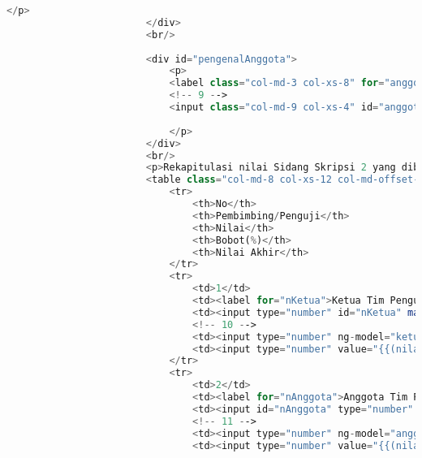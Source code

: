 \begin{lstlisting}[language=PHP,basicstyle=\tiny,caption=skripsi.php]
							</p>
						</div>
						<br/>
					
						<div id="pengenalAnggota">
							<p>
							<label class="col-md-3 col-xs-8" for="anggota">Anggota Tim Penguji:</label>
							<!-- 9 -->
							<input class="col-md-9 col-xs-4" id="anggota" name="namaAnggotaTimPenguji" />
							
							</p>
						</div>
						<br/>
						<p>Rekapitulasi nilai Sidang Skripsi 2 yang diberikan oleh pembimbing, penguji & koordinator skripsi:</p>
						<table class="col-md-8 col-xs-12 col-md-offset-4 col-md-pull-2 table-responsive">
							<tr>
								<th>No</th>
								<th>Pembimbing/Penguji</th>
								<th>Nilai</th>
								<th>Bobot(%)</th>
								<th>Nilai Akhir</th>
							</tr>
							<tr>
								<td>1</td>
								<td><label for="nKetua">Ketua Tim Penguji</label></td>
								<td><input type="number" id="nKetua" max="100" ng-model="nilai_ketua" class="form-nilai" value="{{nilai_TTLaporanK * TTLaporanK.value / 100 + nilai_KMateriK * KMateriK.value / 100 + nilai_PMateriK * PMateriK.value / 100 + nilai_PresentasiK * presentasiK.value / 100 + nilai_PTujuanK * PTujuanK.value / 100}}" disabled="disabled" /></td>
								<!-- 10 -->
								<td><input type="number" ng-model="ketua.value" ng-init="ketua.value = 35" min="0" max="100" class="form-nilai" name="bobotKetuaTimPenguji" readonly="readonly" /></td>
								<td><input type="number" value="{{(nilai_TTLaporanK * TTLaporanK.value / 100 + nilai_KMateriK * KMateriK.value / 100 + nilai_PMateriK * PMateriK.value / 100 + nilai_PresentasiK * presentasiK.value / 100 + nilai_PTujuanK * PTujuanK.value / 100) * ketua.value / 100}}" ng-model="total_ketua" class="form-nilai" disabled="disabled" /></td>
							</tr>
							<tr>
								<td>2</td>
								<td><label for="nAnggota">Anggota Tim Penguji</label></td>
								<td><input id="nAnggota" type="number" max="100" ng-model="nilai_anggota" class="form-nilai" value="{{nilai_TTLaporanA * TTLaporanA.value / 100 + nilai_KMateriA * KMateriA.value / 100 + nilai_PMateriA * PMateriA.value / 100 + nilai_PresentasiA * presentasiA.value / 100 + nilai_PTujuanA * PTujuanA.value / 100}}" disabled="disabled" /></td>
								<!-- 11 -->
								<td><input type="number" ng-model="anggota.value" ng-init="anggota.value = 35" min="0" max="100" class="form-nilai" name="bobotAnggotaTimPenguji" readonly="readonly" /></td>
								<td><input type="number" value="{{(nilai_TTLaporanA * TTLaporanA.value / 100 + nilai_KMateriA * KMateriA.value / 100 + nilai_PMateriA * PMateriA.value / 100 + nilai_PresentasiA * presentasiA.value / 100 + nilai_PTujuanA * PTujuanA.value / 100) * anggota.value / 100}}" ng-model="total_anggota" class="form-nilai" disabled="disabled" /></td>

\end{lstlisting}
